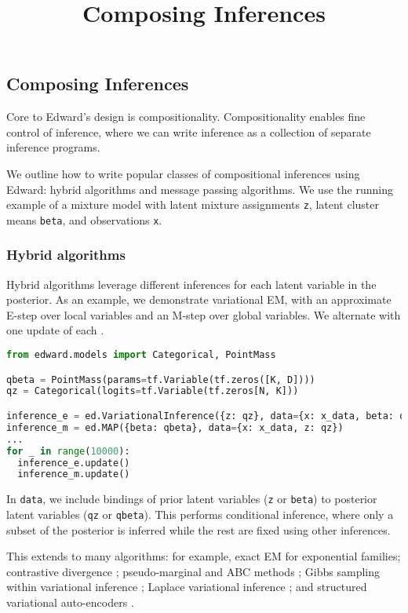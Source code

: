 \title{Composing Inferences}

\subsection{Composing Inferences}

Core to Edward's design is compositionality. Compositionality enables
fine control of inference, where we can write inference as a
collection of separate inference programs.

We outline how to write popular classes of compositional inferences
using Edward: hybrid algorithms and message passing algorithms.
We use the running example of a mixture model
with latent mixture assignments \texttt{z}, latent cluster means
\texttt{beta}, and observations \texttt{x}.

\subsubsection{Hybrid algorithms}

Hybrid algorithms leverage different inferences for each latent
variable in the posterior.
As an example, we demonstrate variational EM, with an approximate
E-step over local variables and an M-step over global variables.
We alternate with one update of each \citep{neal1993new}.

\begin{lstlisting}[language=Python]
from edward.models import Categorical, PointMass

qbeta = PointMass(params=tf.Variable(tf.zeros([K, D])))
qz = Categorical(logits=tf.Variable(tf.zeros[N, K]))

inference_e = ed.VariationalInference({z: qz}, data={x: x_data, beta: qbeta})
inference_m = ed.MAP({beta: qbeta}, data={x: x_data, z: qz})
...
for _ in range(10000):
  inference_e.update()
  inference_m.update()
\end{lstlisting}

In \texttt{data}, we include bindings of prior latent variables
(\texttt{z} or \texttt{beta}) to posterior latent variables
(\texttt{qz} or \texttt{qbeta}). This performs conditional inference,
where only a subset of the posterior is inferred while the rest are
fixed using other inferences.

This extends to many algorithms: for example,
exact EM for exponential families;
contrastive divergence \citep{hinton2002training};
pseudo-marginal and ABC methods \citep{andrieu2009pseudo};
Gibbs sampling within variational inference \citep{wang2012truncation};
Laplace variational inference \citep{wang2013variational};
and
structured variational auto-encoders \citep{johnson2016composing}.

